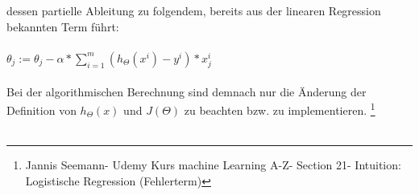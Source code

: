\documentclass[a4paper]{scrreprt}
\begin{document}
dessen partielle Ableitung zu folgendem, bereits aus der linearen Regression bekannten Term führt:\\\\
$\theta_{j}:=\theta_{j}-\alpha*\sum\limits_{i=1}^{m}(h_{\Theta}(x^{i})-y^{i})*x_{j}^{i}$\\\\
Bei der algorithmischen Berechnung sind demnach nur die Änderung der Definition von $h_{\Theta}(x)$ und $J(\Theta)$ zu beachten bzw. zu implementieren.
\footnote{Jannis Seemann- Udemy Kurs machine Learning A-Z- Section 21- Intuition: Logistische Regression (Fehlerterm)}
\\\\
\end{document}
